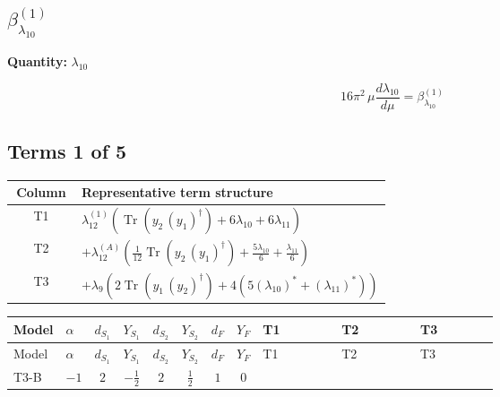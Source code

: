 \documentclass[8pt]{article}
\begin{document}
\begin{landscape}
\section*{$\beta_{\lambda_{10}}^{(1)}$}
\noindent\textbf{Quantity: }$\lambda_{10}$\par\smallskip
\[16\pi^2\,\mu\frac{d \lambda_{10}}{d\mu}=\beta_{\lambda_{10}}^{(1)}\]
\subsection*{Terms 1 of 5}
\begin{center}
\begin{tabular}{@{}c >{\raggedright\arraybackslash}p{0.82\linewidth}@{}}
\toprule
Column & Representative term structure \\
\midrule
T1 & \(\displaystyle {\lambda_{12}^{(1)}} (\operatorname{Tr}\!\left({y_2}\,\left({y_1}\right)^{\dagger}\right)+6 {\lambda_{10}}+6 {\lambda_{11}})\) \\
\midrule
T2 & \(\displaystyle +{\lambda_{12}^{(A)}} \left(\frac{1}{12} \operatorname{Tr}\!\left({y_2}\,\left({y_1}\right)^{\dagger}\right)+\frac{5 {\lambda_{10}}}{6}+\frac{{\lambda_{11}}}{6}\right)\) \\
\midrule
T3 & \(\displaystyle +{\lambda_{9}} (2 \operatorname{Tr}\!\left({y_1}\,\left({y_2}\right)^{\dagger}\right)+4 (5 \left({\lambda_{10}}\right)^{*}+\left({\lambda_{11}}\right)^{*}))\) \\
\midrule
\bottomrule
\end{tabular}
\end{center}
\smallskip
\tiny
\begin{longtable}{@{}llcccccc >{\raggedright\arraybackslash}p{0.21\linewidth} >{\raggedright\arraybackslash}p{0.21\linewidth} >{\raggedright\arraybackslash}p{0.21\linewidth}@{}}
\toprule
Model & $\alpha$ & $d_{S_1}$ & $Y_{S_1}$ & $d_{S_2}$ & $Y_{S_2}$ & $d_F$ & $Y_F$ & T1 & T2 & T3 \\
\midrule
\endfirsthead
\toprule
Model & $\alpha$ & $d_{S_1}$ & $Y_{S_1}$ & $d_{S_2}$ & $Y_{S_2}$ & $d_F$ & $Y_F$ & T1 & T2 & T3 \\
\midrule
\endhead
T3-B & $-1$ & $2$ & $-\frac{1}{2}$ & $2$ & $\frac{1}{2}$ & $1$ & $0$ & \scriptsize\adjustbox{max width=\linewidth}{$\begin{gathered} {\lambda_{12}^{(1)}} (\operatorname{Tr}\!\left({y_2}\,\left({y_1}\right)^{\dagger}\right)+6 {\lambda_{10}}+6 {\lambda_{11}})\end{gathered}$} & \scriptsize\adjustbox{max width=\linewidth}{$\begin{gathered} +{\lambda_{12}^{(A)}} \left(\frac{1}{12} \operatorname{Tr}\!\left({y_2}\,\left({y_1}\right)^{\dagger}\right)+\frac{5 {\lambda_{10}}}{6}+\frac{{\lambda_{11}}}{6}\right)\end{gathered}$} & \scriptsize\adjustbox{max width=\linewidth}{$\begin{gathered} +{\lambda_{9}} (2 \operatorname{Tr}\!\left({y_1}\,\left({y_2}\right)^{\dagger}\right)+4 (5 \left({\lambda_{10}}\right)^{*}+\left({\lambda_{11}}\right)^{*}))\end{gathered}$} \\

\end{longtable}
\end{landscape}
\end{document}
